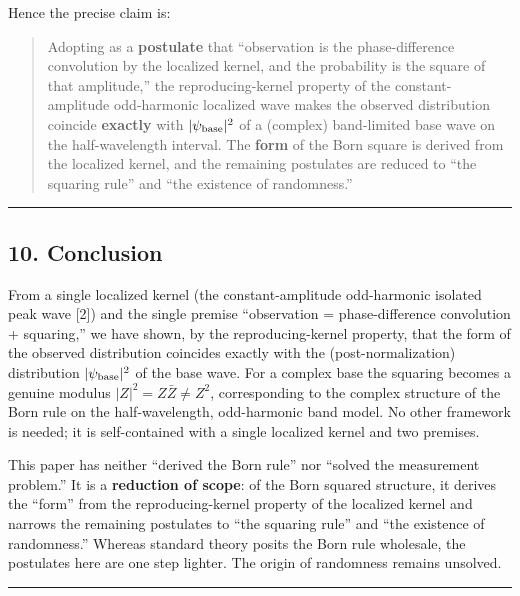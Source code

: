 \documentclass[
]{ltjsarticle}
\begin{document}
Hence the precise claim is:

\begin{quote}
Adopting as a \textbf{postulate} that ``observation is the
phase-difference convolution by the localized kernel, and the
probability is the square of that amplitude,'' the reproducing-kernel
property of the constant-amplitude odd-harmonic localized wave makes the
observed distribution coincide \textbf{exactly} with
\(|\psi_{\rm base}|^2\) of a (complex) band-limited base wave on the
half-wavelength interval. The \textbf{form} of the Born square is
derived from the localized kernel, and the remaining postulates are
reduced to ``the squaring rule'' and ``the existence of randomness.''
\end{quote}

\begin{center}\rule{0.5\linewidth}{0.5pt}\end{center}

\subsection{10. Conclusion}\label{conclusion}

From a single localized kernel (the constant-amplitude odd-harmonic
isolated peak wave {[}2{]}) and the single premise ``observation =
phase-difference convolution + squaring,'' we have shown, by the
reproducing-kernel property, that the form of the observed distribution
coincides exactly with the (post-normalization) distribution
\(|\psi_{\rm base}|^2\) of the base wave. For a complex base the
squaring becomes a genuine modulus \(|Z|^2=Z\bar Z\ne Z^2\),
corresponding to the complex structure of the Born rule on the
half-wavelength, odd-harmonic band model. No other framework is needed;
it is self-contained with a single localized kernel and two premises.

This paper has neither ``derived the Born rule'' nor ``solved the
measurement problem.'' It is a \textbf{reduction of scope}: of the Born
squared structure, it derives the ``form'' from the reproducing-kernel
property of the localized kernel and narrows the remaining postulates to
``the squaring rule'' and ``the existence of randomness.'' Whereas
standard theory posits the Born rule wholesale, the postulates here are
one step lighter. The origin of randomness remains unsolved.

\begin{center}\rule{0.5\linewidth}{0.5pt}\end{center}
\end{document}
